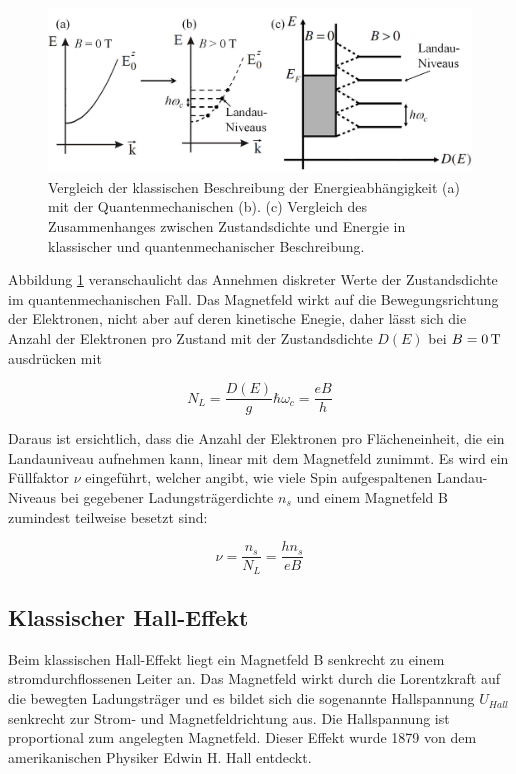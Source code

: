 \begin{figure}[h]
\centering
\includegraphics[width=0.7\linewidth]{images/Anleitungsheft/Landauniveaus_Anleitungsheft}
\caption[Landau Niveaus]{Vergleich der klassischen Beschreibung der Energieabhängigkeit (a) mit der Quantenmechanischen (b). (c) Vergleich des Zusammenhanges zwischen Zustandsdichte und Energie in klassischer und quantenmechanischer Beschreibung.}
\label{fig:Landauniveaus_Anleitungsheft}
\end{figure}

Abbildung \ref{fig:Landauniveaus_Anleitungsheft} veranschaulicht das Annehmen diskreter Werte der Zustandsdichte im quantenmechanischen Fall. 
Das Magnetfeld wirkt auf die Bewegungsrichtung der Elektronen, nicht aber auf deren kinetische Enegie, daher lässt sich die Anzahl der Elektronen pro Zustand mit der Zustandsdichte $D(E)$ bei $B=\unit[0]{T}$ ausdrücken mit

\begin{equation}
N_L=\frac{D(E)}{g}\hbar\omega_c = \frac{eB}{h}
\label{eq:zustandsd_pro_landauniveau}
\end{equation}

Daraus ist ersichtlich, dass die Anzahl der Elektronen pro Flächeneinheit, die ein Landauniveau aufnehmen kann, linear mit dem Magnetfeld zunimmt. Es wird ein Füllfaktor $\nu$ eingeführt, welcher angibt, wie viele Spin aufgespaltenen Landau-Niveaus bei gegebener Ladungsträgerdichte $n_s$ und einem Magnetfeld B zumindest teilweise besetzt sind:

\begin{equation}
\nu=\frac{n_s}{N_L}=\frac{hn_s}{eB}
\label{eq:einfuehrung_fuellfakt}
\end{equation}

\newpage
\subsection{Klassischer Hall-Effekt}

Beim klassischen Hall-Effekt liegt ein Magnetfeld B senkrecht zu einem stromdurchflossenen Leiter an. Das Magnetfeld wirkt durch die Lorentzkraft auf die bewegten Ladungsträger und es bildet sich die sogenannte Hallspannung $U_{Hall}$ senkrecht zur Strom- und Magnetfeldrichtung aus. Die Hallspannung ist proportional zum angelegten Magnetfeld. Dieser Effekt wurde 1879 von dem amerikanischen Physiker Edwin H. Hall entdeckt.

